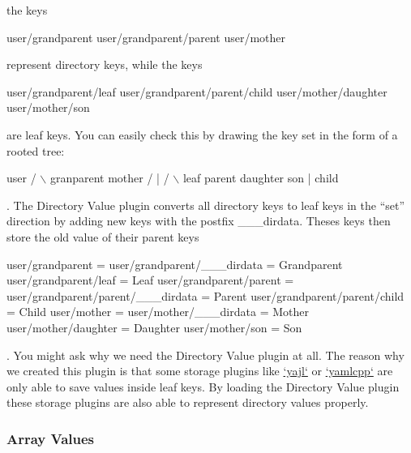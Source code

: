 the keys


\begin{DoxyCode}
user/grandparent
user/grandparent/parent
user/mother
\end{DoxyCode}


represent directory keys, while the keys


\begin{DoxyCode}
user/grandparent/leaf
user/grandparent/parent/child
user/mother/daughter
user/mother/son
\end{DoxyCode}


are leaf keys. You can easily check this by drawing the key set in the form of a rooted tree\+:


\begin{DoxyCode}
             user
      /               \(\backslash\)
  granparent        mother
  /      |          /    \(\backslash\)
leaf  parent    daughter son
         |
       child
\end{DoxyCode}


. The Directory Value plugin converts all directory keys to leaf keys in the “set” direction by adding new keys with the postfix {\ttfamily \+\_\+\+\_\+\+\_\+dirdata}. Theses keys then store the old value of their parent keys


\begin{DoxyCode}
user/grandparent                    =
user/grandparent/\_\_\_dirdata         = Grandparent
user/grandparent/leaf               = Leaf
user/grandparent/parent             =
user/grandparent/parent/\_\_\_dirdata  = Parent
user/grandparent/parent/child       = Child
user/mother                         =
user/mother/\_\_\_dirdata              = Mother
user/mother/daughter                = Daughter
user/mother/son                     = Son
\end{DoxyCode}


. You might ask why we need the Directory Value plugin at all. The reason why we created this plugin is that some storage plugins like \hyperlink{md_src_plugins_yajl_README_src_plugins_yajl_README_md}{`yajl`} or \hyperlink{md_src_plugins_yajl_README_src_plugins_yajl_README_md}{`yamlcpp`} are only able to save values inside leaf keys. By loading the Directory Value plugin these storage plugins are also able to represent directory values properly.

\subsubsection*{Array Values}

